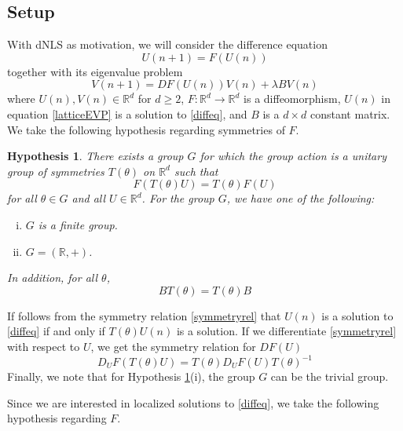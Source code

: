 \documentclass[12pt]{article}
\def\R{{\mathbb R}}
\newtheorem{hypothesis}{Hypothesis}
\begin{document}
\subsection{Setup}

With dNLS as motivation, we will consider the difference equation
\begin{equation}\label{diffeq}
U(n+1) = F(U(n))
\end{equation}
together with its eigenvalue problem
\begin{equation}\label{latticeEVP}
V(n+1) = DF(U(n)) V(n) + \lambda B V(n)
\end{equation}
where $U(n), V(n) \in \R^d$ for $d \geq 2$, $F: \R^d \rightarrow \R^d$ is a diffeomorphism, $U(n)$ in equation \eqref{latticeEVP} is a solution to \eqref{diffeq}, and $B$ is a $d \times d$ constant matrix. We take the following hypothesis regarding symmetries of $F$.

\begin{hypothesis}\label{symmetryhyp}
There exists a group $G$ for which the group action is a unitary group of symmetries $T(\theta)$ on $\R^d$ such that 
\begin{equation}\label{symmetryrel}
F(T(\theta)U) = T(\theta)F(U)
\end{equation}
for all $\theta \in G$ and all $U \in \R^d$. For the group $G$, we have one of the following:
\begin{enumerate}[(i)]
\item $G$ is a finite group.
\item $G = (\R, +)$.
\end{enumerate}
In addition, for all $\theta$, 
\begin{equation}\label{BTcommute}
B T(\theta) = T(\theta) B
\end{equation}
\end{hypothesis}
If follows from the symmetry relation \eqref{symmetryrel} that $U(n)$ is a solution to \eqref{diffeq} if and only if $T(\theta)U(n)$ is a solution. If we differentiate \eqref{symmetryrel} with respect to $U$, we get the symmetry relation for $DF(U)$
\begin{equation}\label{DFtheta}
D_U F(T(\theta)U) = T(\theta) D_U F(U)T(\theta)^{-1}
\end{equation}
Finally, we note that for Hypothesis \ref{symmetryhyp}(i), the group $G$ can be the trivial group. 

Since we are interested in localized solutions to \eqref{diffeq}, we take the following hypothesis regarding $F$.
\end{document}
